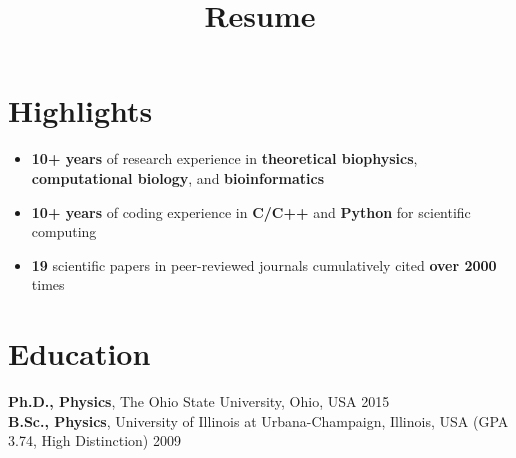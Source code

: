 \documentclass[11pt]{../yhlcv}
\begin{document}
\title{Resume}

\maketitle

\raggedright

\section*{Highlights}

\begin{itemize}[leftmargin=*]\itemsep-0.2em
\item {\bf 10+ years} of research experience in {\bf theoretical biophysics}, {\bf computational biology}, and {\bf bioinformatics}
\item {\bf 10+ years} of coding experience in {\bf C/C++} and {\bf Python} for scientific computing
\item {\bf 19} scientific papers in peer-reviewed journals cumulatively cited {\bf over 2000} times
\end{itemize}

\section*{Education}

{\bf Ph.D., Physics}, The Ohio State University, Ohio, USA \hfill 2015 \\
{\bf B.Sc., Physics}, University of Illinois at Urbana-Champaign, Illinois, USA (GPA 3.74, High Distinction) \hfill 2009

\end{document}
